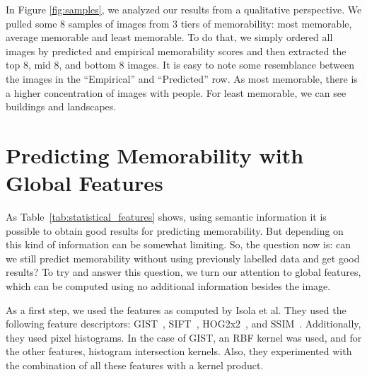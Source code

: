 \documentclass[10pt,twocolumn,letterpaper]{article}
\begin{document}
In Figure \ref{fig:samples}, we analyzed our results from a qualitative perspective. We pulled some 8 samples of images from 3 tiers of memorability: most memorable, average memorable and least memorable. To do that, we simply ordered all images by predicted and empirical memorability scores and then extracted the top 8, mid 8, and bottom 8 images. It is easy to note some resemblance between the images in the ``Empirical'' and ``Predicted'' row. As most memorable, there is a higher concentration of images with people. For least memorable, we can see buildings and landscapes.


\section{Predicting Memorability with Global Features}
As Table~\ref{tab:statistical_features} shows, using semantic information it is possible to obtain good results for predicting memorability. But depending on this kind of information can be somewhat limiting. So, the question now is: can we still predict memorability without using previously labelled data and get good results? To try and answer this question, we turn our attention to global features, which can be computed using no additional information besides the image.

As a first step, we used the features as computed by Isola et al. They used the following feature descriptors: GIST~\cite{gist}, SIFT~\cite{sift}, HOG2x2~\cite{hog}, and SSIM~\cite{ssim}. Additionally, they used pixel histograms. In the case of GIST, an RBF kernel was used, and for the other features, histogram intersection kernels. Also, they experimented with the combination of all these features with a kernel product.
\end{document}
